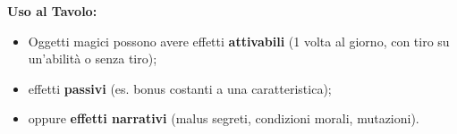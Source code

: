 \documentclass[../manuale_main.tex]{subfiles}
\begin{document}
\textbf{Uso al Tavolo:} 
\begin{itemize}
  \item Oggetti magici possono avere effetti \textbf{attivabili} (1 volta al giorno, con tiro su un'abilità o senza tiro);
  \item effetti \textbf{passivi} (es. bonus costanti a una caratteristica);
  \item oppure \textbf{effetti narrativi} (malus segreti, condizioni morali, mutazioni).
\end{itemize}
\end{document}
